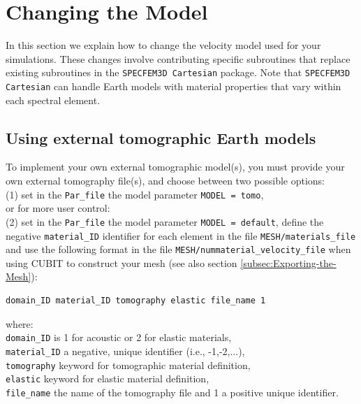 \chapter{Changing the Model}\label{cha:-Changing-the}

In this section we explain how to change the velocity model used for
your simulations. These changes involve contributing specific subroutines
that replace existing subroutines in the \texttt{SPECFEM3D Cartesian}
package. Note that \texttt{SPECFEM3D Cartesian} can handle Earth models
with material properties that vary within each spectral element.


\section{Using external tomographic Earth models}\label{sec:Using-tomographic}

To implement your own external tomographic model(s), you must provide
your own external tomography file(s), and choose between two possible
options:\\
 \indent (1) set in the \texttt{Par\_file} the model parameter \texttt{MODEL
= tomo}, \\
 or for more user control: \\
 \indent (2) set in the \texttt{Par\_file} the model parameter \texttt{MODEL
= default}, define the negative \texttt{material\_ID} identifier for
each element in the file \texttt{MESH/materials\_file} and use the
following format in the file \texttt{MESH/nummaterial\_velocity\_file}
when using CUBIT to construct your mesh (see also section \ref{subsec:Exporting-the-Mesh}):
\begin{verbatim}
domain_ID material_ID tomography elastic file_name 1
\end{verbatim}
where: \\
 \indent \texttt{domain\_ID} is 1 for acoustic or 2 for elastic materials,
\\
 \indent \texttt{material\_ID} a negative, unique identifier (i.e.,
-1,-2,...), \\
 \indent \texttt{tomography} keyword for tomographic material definition,
\\
 \indent \texttt{elastic} keyword for elastic material definition,
\\
 \indent \texttt{file\_name} the name of the tomography file and
1 a positive unique identifier.\\


